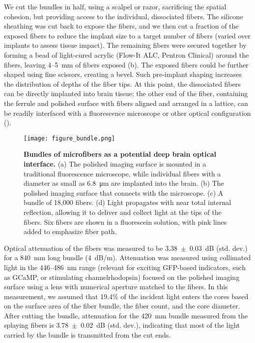 We cut the bundles in half, using a scalpel or razor, sacrificing the spatial 
cohesion, but providing access to the individual, dissociated fibers. The silicone 
sheathing was cut back to expose the fibers, and we then cut a fraction of the 
exposed fibers to reduce the implant size to a target number of fibers (varied 
over implants to assess tissue impact). The remaining fibers were secured 
together by forming a bead of light-cured acrylic (Flow-It ALC, Pentron Clinical) 
around the fibers, leaving 4--5~mm of fibers exposed (b). The exposed fibers could be 
further shaped using fine scissors, creating a bevel. Such pre-implant shaping 
increases the distribution of depths of the fiber tips. At this point, the 
dissociated fibers can be directly implanted into brain tissue; the other end of 
the fiber, containing the ferrule and polished surface with fibers aligned and 
arranged in a lattice, can be readily interfaced with a fluorescence microscope or 
other optical configuration ().


\begin{figure}
\texttt{[image: figure\_bundle.png]}
\caption[Diagram of bundle of microfibers as an 
optical interface.]{\textbf{Bundles of microfibers as a potential deep brain 
optical interface.} (a) The polished imaging surface is 
mounted in a traditional fluorescence microscope, while 
individual fibers with a diameter as small as 
6.8~\si{\micro\meter} are implanted into the brain. (b) The polished 
imaging surface that connects with the microscope. 
(c) A bundle of 18,000 fibers. (d) Light propagates with 
near total internal reflection, allowing it to deliver 
and collect light at the tips of the fibers. Six fibers are shown in a 
fluorescein solution, with pink lines added to emphasize 
fiber path.}
\label{fig:bundle}
\end{figure}

Optical attenuation of the fibers was measured to be 3.38~$\pm$~0.03~dB (std. dev.) 
for a 840~mm long bundle (4~dB/m). Attenuation was measured using collimated light in the 
446--486~nm range (relevant for exciting GFP-based indicators, such as GCaMP, or 
stimulating channelrhodopsin) focused on the polished imaging surface using a lens 
with numerical aperture matched to the fibers. In this measurement, we assumed that
19.4\% of the incident light enters the cores based on the surface area of the fiber 
bundle, the fiber count, and the core diameter. 
After cutting the bundle, attenuation for the 420~mm bundle measured 
from the splaying fibers is 3.78~$\pm$~0.02~dB (std. dev.), indicating that most of 
the light carried by the bundle is transmitted from the cut ends.

